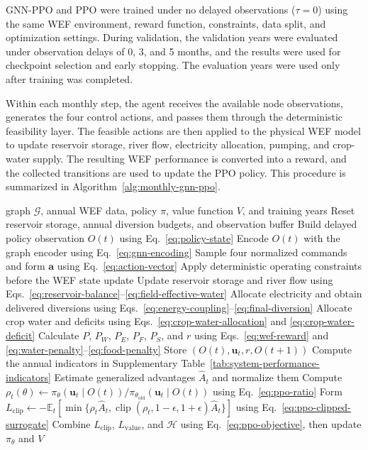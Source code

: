\documentclass [a4paper,fleqn] {cas-dc}
\begin{document}
GNN-PPO and PPO were trained under no delayed observations ($\tau=0$) using the same WEF environment, reward function, constraints, data split, and optimization settings. During validation, the validation years were evaluated under observation delays of 0, 3, and 5 months, and the results were used for checkpoint selection and early stopping. The evaluation years were used only after training was completed.

Within each monthly step, the agent receives the available node observations, generates the four control actions, and passes them through the deterministic feasibility layer. The feasible actions are then applied to the physical WEF model to update reservoir storage, river flow, electricity allocation, pumping, and crop-water supply. The resulting WEF performance is converted into a reward, and the collected transitions are used to update the PPO policy. This procedure is summarized in Algorithm~\ref{alg:monthly-gnn-ppo}.

\begin{algorithm}[H] \caption{Monthly GNN-PPO training and WEF execution} \label{alg:monthly-gnn-ppo} \scriptsize \begin{algorithmic}[1] \Require graph $\mathcal G$, annual WEF data, policy $\pi$, value function $V$, and training years   \State Reset reservoir storage, annual diversion budgets, and observation buffer  \State Build delayed policy observation $O(t)$ using Eq.~\eqref{eq:policy-state} \State Encode $O(t)$ with the graph encoder using Eq.~\eqref{eq:gnn-encoding} \State Sample four normalized commands and form $\mathbf a$ using Eq.~\eqref{eq:action-vector} \State Apply deterministic operating constraints before the WEF state update \State Update reservoir storage and river flow using Eqs.~\eqref{eq:reservoir-balance}--\eqref{eq:field-effective-water} \State Allocate electricity and obtain delivered diversions using Eqs.~\eqref{eq:energy-coupling}--\eqref{eq:final-diversion} \State Allocate crop water and deficits using Eqs.~\eqref{eq:crop-water-allocation} and \eqref{eq:crop-water-deficit} \State Calculate $P$, $P_W$, $P_E$, $P_F$, $P_S$, and $r$ using Eqs.~\eqref{eq:wef-reward} and \eqref{eq:water-penalty}--\eqref{eq:food-penalty} \State Store $(O(t),\mathbf u_t,r,O(t+1))$ \EndFor \State Compute the annual indicators in Supplementary Table~\ref{tab:system-performance-indicators} \EndFor \State Estimate generalized advantages $\hat A_t$ and normalize them \State Compute $\rho_t(\theta)\gets\pi_\theta(\mathbf u_t\mid O(t))/\pi_{\theta_{\mathrm{old}}}(\mathbf u_t\mid O(t))$ using Eq.~\eqref{eq:ppo-ratio} \State Form $L_{\mathrm{clip}}\gets-\mathbb E_t[\min\{\rho_t\hat A_t,\operatorname{clip}(\rho_t,1-\epsilon,1+\epsilon)\hat A_t\}]$ using Eq.~\eqref{eq:ppo-clipped-surrogate} \State Combine $L_{\mathrm{clip}}$, $L_{\mathrm{value}}$, and $\mathcal H$ using Eq.~\eqref{eq:ppo-objective}, then update $\pi_\theta$ and $V$ \EndFor \end{algorithmic} \end{algorithm}
\end{document}
